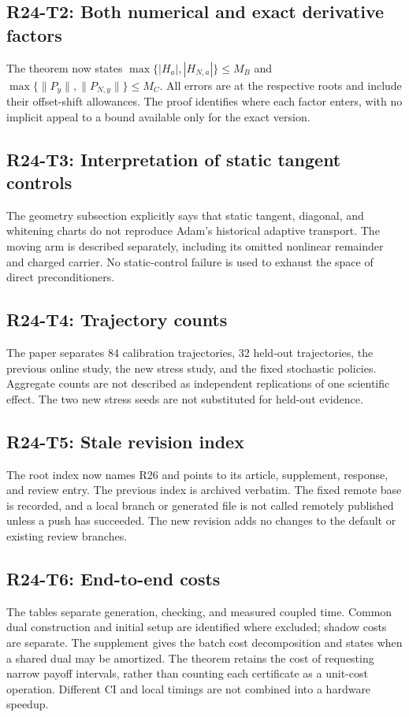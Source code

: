 \subsection{R24-T2: Both numerical and exact derivative factors}
The theorem now states $\max\{|H_a|,|H_{N,a}|\}\leq M_B$ and $\max\{\|P_y\|,\|P_{N,y}\|\}\leq M_C$. All errors are at the respective roots and include their offset-shift allowances. The proof identifies where each factor enters, with no implicit appeal to a bound available only for the exact version.

\subsection{R24-T3: Interpretation of static tangent controls}
The geometry subsection explicitly says that static tangent, diagonal, and whitening charts do not reproduce Adam's historical adaptive transport. The moving arm is described separately, including its omitted nonlinear remainder and charged carrier. No static-control failure is used to exhaust the space of direct preconditioners.

\subsection{R24-T4: Trajectory counts}
The paper separates 84 calibration trajectories, 32 held-out trajectories, the previous online study, the new stress study, and the fixed stochastic policies. Aggregate counts are not described as independent replications of one scientific effect. The two new stress seeds are not substituted for held-out evidence.

\subsection{R24-T5: Stale revision index}
The root index now names R26 and points to its article, supplement, response, and review entry. The previous index is archived verbatim. The fixed remote base is recorded, and a local branch or generated file is not called remotely published unless a push has succeeded. The new revision adds no changes to the default or existing review branches.

\subsection{R24-T6: End-to-end costs}
The tables separate generation, checking, and measured coupled time. Common dual construction and initial setup are identified where excluded; shadow costs are separate. The supplement gives the batch cost decomposition and states when a shared dual may be amortized. The theorem retains the cost of requesting narrow payoff intervals, rather than counting each certificate as a unit-cost operation. Different CI and local timings are not combined into a hardware speedup.

